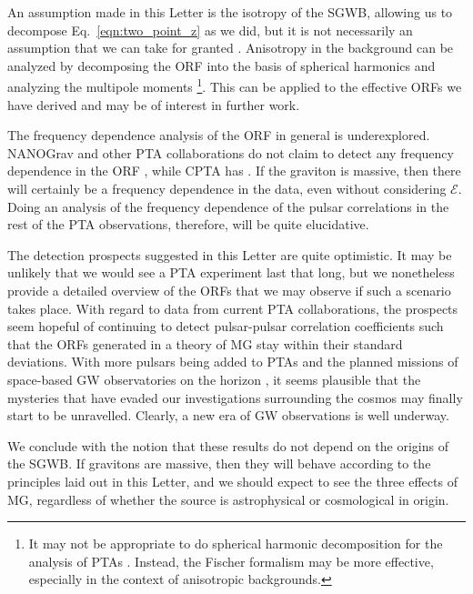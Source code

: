 \documentclass[prd,twocolumn,aps,psfig,nofootinbib,nobibnotes,superscriptaddress,preprintnumbers,times]{revtex4-2}
\begin{document}
An assumption made in this Letter is the isotropy of the SGWB, allowing us to decompose Eq.~\ref{eqn:two_point_z} as we did, but it is not necessarily an assumption that we can take for granted \cite{Depta:2024ykq, Bravo:2025csu, Cusin:2025xle, Kuwahara:2024jiz, Li:2024lvt}. Anisotropy in the background can be analyzed by decomposing the ORF into the basis of spherical harmonics and analyzing the multipole moments \cite{Allen:2024bnk, Gair:2014rwa}\footnote{It may not be appropriate to do spherical harmonic decomposition for the analysis of PTAs \cite{Ali-Haimoud:2020ozu}. Instead, the Fischer formalism may be more effective, especially in the context of anisotropic backgrounds.}. 
This can be applied to the effective ORFs we have derived and may be of interest in further work. 
%

The frequency dependence analysis of the ORF in general is underexplored. NANOGrav and other PTA collaborations do not claim to detect any frequency dependence in the ORF \cite{Agazie:2023,EPTA:2023sfo,EPTA:2023akd,EPTA:2023fyk, Zic:2023gta,Reardon:2023gzh} , while CPTA has \cite{Xu:2023wog}. If the graviton is massive, then there will certainly be a frequency dependence in the data, even without considering $\mathcal{E}$. Doing an analysis of the frequency dependence of the pulsar correlations in the rest of the PTA observations, therefore, will be quite elucidative. 

The detection prospects suggested in this Letter are quite optimistic. It may be unlikely that we would see a PTA experiment last that long, but we nonetheless provide a detailed overview of the ORFs that we may observe if such a scenario takes place. With regard to data from current PTA collaborations, the prospects seem hopeful of continuing to detect pulsar-pulsar correlation coefficients such that the ORFs generated in a theory of MG stay within their standard deviations. With more pulsars being added to PTAs and the planned missions of space-based GW observatories on the horizon \cite{LISA:2017, TianQin:2015yph, Hu:2017mde}, it seems plausible that the mysteries that have evaded our investigations surrounding the cosmos may finally start to be unravelled. Clearly, a new era of GW observations is well underway. 

We conclude with the notion that these results do not depend on the origins of the SGWB. If gravitons are massive, then they will behave according to the principles laid out in this Letter, and we should expect to see the three effects of MG, regardless of whether the source is astrophysical or cosmological in origin.
\end{document}
